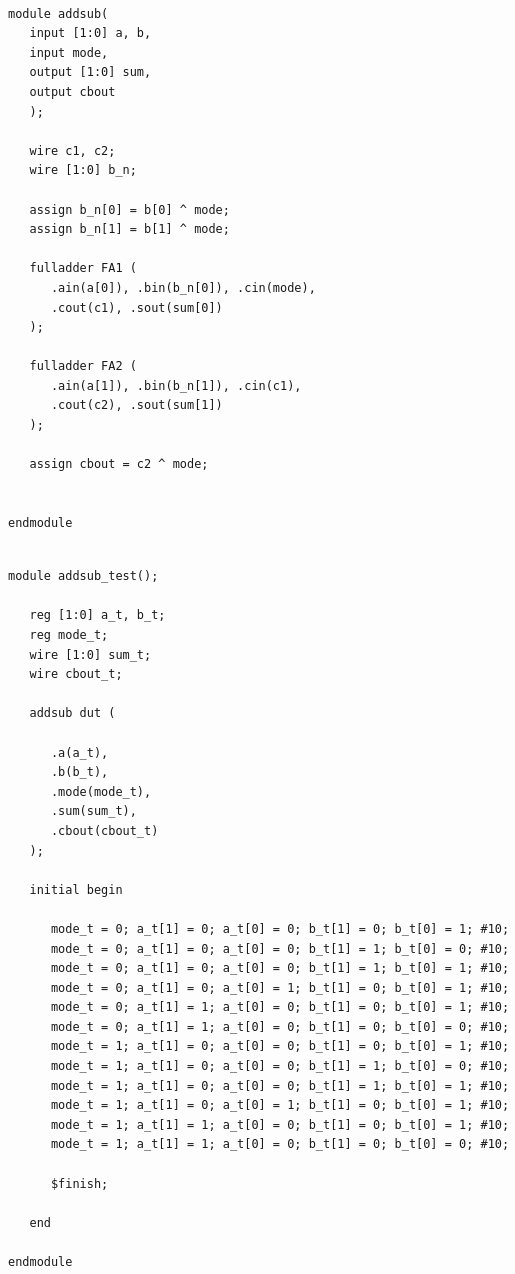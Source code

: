 \documentclass[11pt]{article}
\begin{document}
\begin{lstlisting}

module addsub(
   input [1:0] a, b,
   input mode,
   output [1:0] sum,
   output cbout
   );

   wire c1, c2;
   wire [1:0] b_n;

   assign b_n[0] = b[0] ^ mode;
   assign b_n[1] = b[1] ^ mode;

   fulladder FA1 (
      .ain(a[0]), .bin(b_n[0]), .cin(mode),
      .cout(c1), .sout(sum[0])
   );

   fulladder FA2 (
      .ain(a[1]), .bin(b_n[1]), .cin(c1),
      .cout(c2), .sout(sum[1])
   );

   assign cbout = c2 ^ mode;


endmodule

\end{lstlisting}

\begin{lstlisting}

module addsub_test();

   reg [1:0] a_t, b_t;
   reg mode_t;
   wire [1:0] sum_t;
   wire cbout_t;

   addsub dut (

      .a(a_t),
      .b(b_t),
      .mode(mode_t),
      .sum(sum_t),
      .cbout(cbout_t)
   );

   initial begin 

      mode_t = 0; a_t[1] = 0; a_t[0] = 0; b_t[1] = 0; b_t[0] = 1; #10;
      mode_t = 0; a_t[1] = 0; a_t[0] = 0; b_t[1] = 1; b_t[0] = 0; #10;
      mode_t = 0; a_t[1] = 0; a_t[0] = 0; b_t[1] = 1; b_t[0] = 1; #10;
      mode_t = 0; a_t[1] = 0; a_t[0] = 1; b_t[1] = 0; b_t[0] = 1; #10;
      mode_t = 0; a_t[1] = 1; a_t[0] = 0; b_t[1] = 0; b_t[0] = 1; #10;
      mode_t = 0; a_t[1] = 1; a_t[0] = 0; b_t[1] = 0; b_t[0] = 0; #10;
      mode_t = 1; a_t[1] = 0; a_t[0] = 0; b_t[1] = 0; b_t[0] = 1; #10;
      mode_t = 1; a_t[1] = 0; a_t[0] = 0; b_t[1] = 1; b_t[0] = 0; #10;
      mode_t = 1; a_t[1] = 0; a_t[0] = 0; b_t[1] = 1; b_t[0] = 1; #10;
      mode_t = 1; a_t[1] = 0; a_t[0] = 1; b_t[1] = 0; b_t[0] = 1; #10;
      mode_t = 1; a_t[1] = 1; a_t[0] = 0; b_t[1] = 0; b_t[0] = 1; #10;
      mode_t = 1; a_t[1] = 1; a_t[0] = 0; b_t[1] = 0; b_t[0] = 0; #10;

      $finish;

   end

endmodule

\end{lstlisting}
\end{document}
